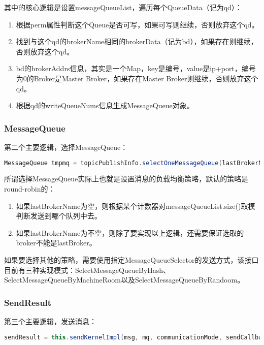 其中的核心逻辑是设置messageQueueList，遍历每个QueueData（记为qd）：

\begin{enumerate}[itemindent=1em]
\item 根据perm属性判断这个Queue是否可写，如果可写则继续，否则放弃这个qd。
\item 找到与这个qd的brokerName相同的brokerData（记为bd），如果存在则继续，否则放弃这个qd。
\item bd的brokerAddrs信息，其实是一个Map，key是编号，value是ip+port，编号为0的Broker是Master Broker，如果存在Master Broker则继续，否则放弃这个qd。
\item 根据qd的writeQueueNums信息生成MessageQueue对象。
\end{enumerate}


\subsubsection{MessageQueue}
第二个主要逻辑，选择MessageQueue：

\begin{lstlisting}[language=Java, style=customStyleJavaLight]
MessageQueue tmpmq = topicPublishInfo.selectOneMessageQueue(lastBrokerName);
\end{lstlisting}

所谓选择MessageQueue实际上也就是设置消息的负载均衡策略，默认的策略是round-robin的：

\begin{enumerate}[itemindent=1em]
\item 如果lastBrokerName为空，则根据某个计数器对messageQueueList.size()取模判断发送到哪个队列中去。
\item 如果lastBrokerName为不空，则除了要实现以上逻辑，还需要保证选取的broker不能是lastBroker。
\end{enumerate}

如果要选择其他的策略，需要使用指定MessageQueueSelector的发送方式\cite{order-example}，该接口目前有三种实现模式：SelectMessageQueueByHash、SelectMessageQueueByMachineRoom以及SelectMessageQueueByRandoom。


\subsubsection{SendResult}
第三个主要逻辑，发送消息：
\begin{lstlisting}[language=Java, style=customStyleJavaLight]
sendResult = this.sendKernelImpl(msg, mq, communicationMode, sendCallback, timeout);
\end{lstlisting}


